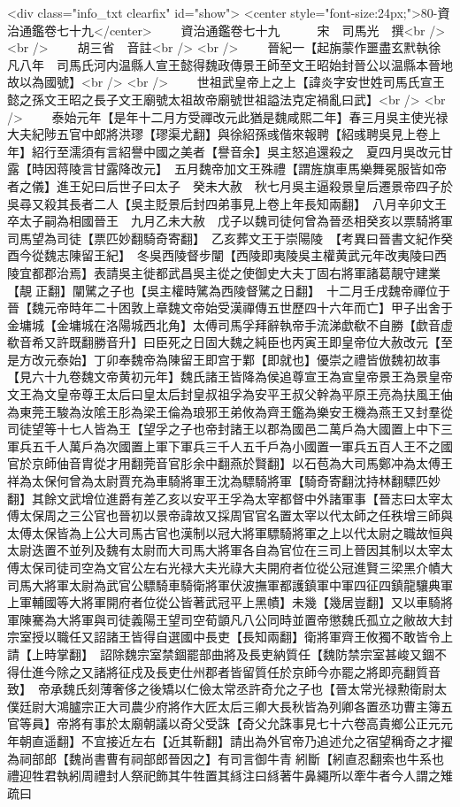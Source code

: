 <div class="info_txt clearfix" id="show">
<center style="font-size:24px;">80-資治通鑑卷七十九</center>
  　　資治通鑑卷七十九　　　宋　司馬光　撰<br />
<br />
　　胡三省　音註<br />
<br />
　　晉紀一【起旃蒙作噩盡玄黓執徐凡八年　司馬氏河内温縣人宣王懿得魏政傳景王師至文王昭始封晉公以温縣本晉地故以為國號】<br />
<br />
　　世祖武皇帝上之上【諱炎字安世姓司馬氏宣王懿之孫文王昭之長子文王廟號太祖故帝廟號世祖謚法克定禍亂曰武】<br />
<br />
　　泰始元年【是年十二月方受禪改元此猶是魏咸熙二年】春三月吳主使光禄大夫紀陟五官中郎將洪璆【璆渠尤翻】與徐紹孫彧偕來報聘【紹彧聘吳見上卷上年】紹行至濡須有言紹譽中國之美者【譽音余】吳主怒追還殺之　夏四月吳改元甘露【時因蒋陵言甘露降改元】　五月魏帝加文王殊禮【謂旌旗車馬樂舞冕服皆如帝者之儀】進王妃曰后世子曰太子　癸未大赦　秋七月吳主逼殺景皇后遷景帝四子於吳尋又殺其長者二人【吳主貶景后封四弟事見上卷上年長知兩翻】　八月辛卯文王卒太子嗣為相國晉王　九月乙未大赦　戊子以魏司徒何曾為晉丞相癸亥以票騎將軍司馬望為司徒【票匹妙翻騎奇寄翻】　乙亥葬文王于崇陽陵　【考異曰晉書文紀作癸酉今從魏志陳留王紀】　冬吳西陵督步闡【西陵即夷陵吳主權黄武元年改夷陵曰西陵宜都郡治焉】表請吳主徙都武昌吳主從之使御史大夫丁固右將軍諸葛靚守建業【靚正翻】闡騭之子也【吳主權時騭為西陵督騭之日翻】　十二月壬戌魏帝禪位于晉【魏元帝時年二十困敦上章魏文帝始受漢禪傳五世歷四十六年而亡】甲子出舍于金墉城【金墉城在洛陽城西北角】太傅司馬孚拜辭執帝手流涕歔欷不自勝【歔音虚欷音希又許既翻勝音升】曰臣死之日固大魏之純臣也丙寅王即皇帝位大赦改元【至是方改元泰始】丁卯奉魏帝為陳留王即宫于鄴【即就也】優崇之禮皆倣魏初故事【見六十九卷魏文帝黄初元年】魏氏諸王皆降為侯追尊宣王為宣皇帝景王為景皇帝文王為文皇帝尊王太后曰皇太后封皇叔祖孚為安平王叔父幹為平原王亮為扶風王伷為東莞王駿為汝隂王肜為梁王倫為琅邪王弟攸為齊王鑑為樂安王機為燕王又封羣從司徒望等十七人皆為王【望孚之子也帝封諸王以郡為國邑二萬戶為大國置上中下三軍兵五千人萬戶為次國置上軍下軍兵三千人五千戶為小國置一軍兵五百人王不之國官於京師伷音胄從才用翻莞音官肜余中翻燕於賢翻】以石苞為大司馬鄭冲為太傅王祥為太保何曾為太尉賈充為車騎將軍王沈為驃騎將軍【騎奇寄翻沈持林翻驃匹妙翻】其餘文武增位進爵有差乙亥以安平王孚為太宰都督中外諸軍事【晉志曰太宰太傅太保周之三公官也晉初以景帝諱故又採周官官名置太宰以代太師之任秩增三師與太傅太保皆為上公大司馬古官也漢制以冠大將軍驃騎將軍之上以代太尉之職故恒與太尉迭置不並列及魏有太尉而大司馬大將軍各自為官位在三司上晉因其制以太宰太傅太保司徒司空為文官公左右光禄大夫光祿大夫開府者位從公冠進賢三梁黑介幘大司馬大將軍太尉為武官公驃騎車騎衛將軍伏波撫軍都護鎮軍中軍四征四鎮龍驤典軍上軍輔國等大將軍開府者位從公皆著武冠平上黑幘】未幾【幾居豈翻】又以車騎將軍陳騫為大將軍與司徒義陽王望司空荀顗凡八公同時並置帝懲魏氏孤立之敝故大封宗室授以職任又詔諸王皆得自選國中長吏【長知兩翻】衛將軍齊王攸獨不敢皆令上請【上時掌翻】　詔除魏宗室禁錮罷部曲將及長吏納質任【魏防禁宗室甚峻又錮不得仕進今除之又諸將征戍及長吏仕州郡者皆留質任於京師今亦罷之將即亮翻質音致】　帝承魏氏刻薄奢侈之後矯以仁儉太常丞許奇允之子也【晉太常光禄勲衛尉太僕廷尉大鴻臚宗正大司農少府將作大匠太后三卿大長秋皆為列卿各置丞功曹主簿五官等員】帝將有事於太廟朝議以奇父受誅【奇父允誅事見七十六卷高貴鄉公正元元年朝直遥翻】不宜接近左右【近其靳翻】請出為外官帝乃追述允之宿望稱奇之才擢為祠部郎【魏尚書曹有祠部郎晉因之】有司言御牛青紖斷【紖直忍翻索也牛系也禮迎牲君執紖周禮封人祭祀飾其牛牲置其絼注曰絼著牛鼻繩所以牽牛者今人謂之雉疏曰